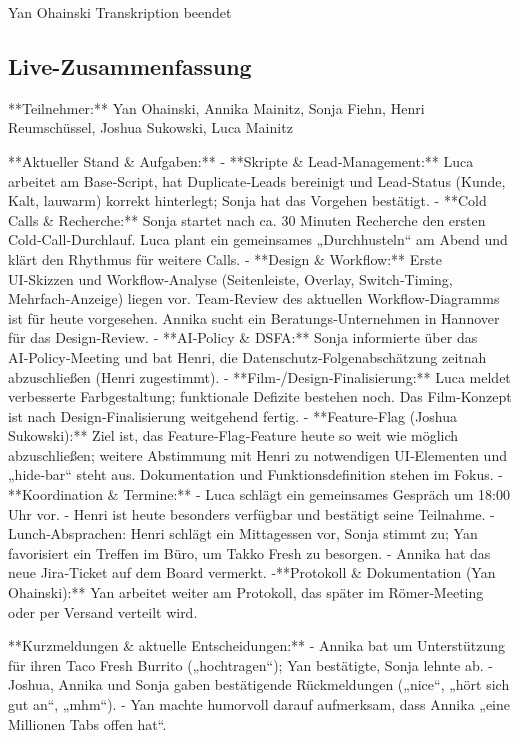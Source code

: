 Yan Ohainski Transkription beendet

\subsection{Live-Zusammenfassung}
\label{app:Daily1_live}
**Teilnehmer:** Yan Ohainski, Annika Mainitz, Sonja Fiehn, Henri Reumschüssel, Joshua Sukowski, Luca Mainitz  

**Aktueller Stand \& Aufgaben:**  
- **Skripte \& Lead‑Management:** Luca arbeitet am Base‑Script, hat Duplicate‑Leads bereinigt und Lead‑Status (Kunde, Kalt, lauwarm) korrekt hinterlegt; Sonja hat das Vorgehen bestätigt.  
- **Cold Calls \& Recherche:** Sonja startet nach ca. 30 Minuten Recherche den ersten Cold‑Call‑Durchlauf. Luca plant ein gemeinsames „Durchhusteln“ am Abend und klärt den Rhythmus für weitere Calls.  
- **Design \& Workflow:** Erste UI‑Skizzen und Workflow‑Analyse (Seitenleiste, Overlay, Switch‑Timing, Mehrfach‑Anzeige) liegen vor. Team‑Review des aktuellen Workflow‑Diagramms ist für heute vorgesehen. Annika sucht ein Beratungs‑Unternehmen in Hannover für das Design‑Review.  
- **AI‑Policy \& DSFA:** Sonja informierte über das AI‑Policy‑Meeting und bat Henri, die Datenschutz‑Folgenabschätzung zeitnah abzuschließen (Henri zugestimmt).  
- **Film‑/Design‑Finalisierung:** Luca meldet verbesserte Farbgestaltung; funktionale Defizite bestehen noch. Das Film‑Konzept ist nach Design‑Finalisierung weitgehend fertig.  
- **Feature‑Flag (Joshua Sukowski):** Ziel ist, das Feature‑Flag‑Feature heute so weit wie möglich abzuschließen; weitere Abstimmung mit Henri zu notwendigen UI‑Elementen und „hide‑bar“ steht aus. Dokumentation und Funktionsdefinition stehen im Fokus.  
- **Koordination \& Termine:**  
  - Luca schlägt ein gemeinsames Gespräch um 18:00 Uhr vor.  
  - Henri ist heute besonders verfügbar und bestätigt seine Teilnahme.  
  - Lunch‑Absprachen: Henri schlägt ein Mittagessen vor, Sonja stimmt zu; Yan favorisiert ein Treffen im Büro, um Takko Fresh zu besorgen.  
  - Annika hat das neue Jira‑Ticket auf dem Board vermerkt.  
-**Protokoll \& Dokumentation (Yan Ohainski):** Yan arbeitet weiter am Protokoll, das später im Römer‑Meeting oder per Versand verteilt wird.  

**Kurzmeldungen \& aktuelle Entscheidungen:**  
- Annika bat um Unterstützung für ihren Taco Fresh Burrito („hochtragen“); Yan bestätigte, Sonja lehnte ab.  
- Joshua, Annika und Sonja gaben bestätigende Rückmeldungen („nice“, „hört sich gut an“, „mhm“).  
- Yan machte humorvoll darauf aufmerksam, dass Annika „eine Millionen Tabs offen hat“.  

